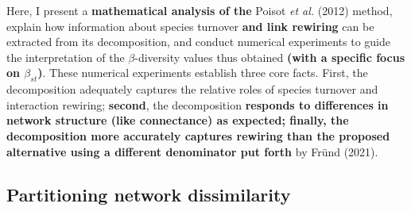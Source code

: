\documentclass[11pt]{article}
\makeatletter
\def\maxwidth{\ifdim\Gin@nat@width>\linewidth\linewidth
\else\Gin@nat@width\fi}
\let\Oldincludegraphics\includegraphics
\renewcommand{\includegraphics}[1]{\Oldincludegraphics[width=\maxwidth]{#1}}
\providecommand{\DIFaddtex}[1]{{\bf #1}} %
\providecommand{\DIFdeltex}[1]{} %
\providecommand{\DIFaddbegin}{\protect\color{blue}} %
\providecommand{\DIFaddend}{\protect\color{black}} %
\providecommand{\DIFdelbegin}{\protect\color{red}} %
\providecommand{\DIFdelend}{\protect\color{black}} %
\providecommand{\DIFadd}[1]{\texorpdfstring{\DIFaddtex{#1}}{#1}} %
\providecommand{\DIFdel}[1]{\texorpdfstring{\DIFdeltex{#1}}{}} %
\newcommand{\DIFscaledelfig}{0.5}
\newlength{\DIFdelgraphicswidth} %
\newlength{\DIFdelgraphicsheight} %
\newcommand{\DIFaddincludegraphics}[2][]{{\color{blue}\fbox{\DIFOincludegraphics[#1]{#2}}}} %
\newcommand{\DIFdelincludegraphics}[2][]{%
\sbox{\DIFdelgraphicsbox}{\DIFOincludegraphics[#1]{#2}}%
\settoboxwidth{\DIFdelgraphicswidth}{\DIFdelgraphicsbox} %
\settoboxtotalheight{\DIFdelgraphicsheight}{\DIFdelgraphicsbox} %
\scalebox{\DIFscaledelfig}{%
\parbox[b]{\DIFdelgraphicswidth}{\usebox{\DIFdelgraphicsbox}\\[-\baselineskip] \rule{\DIFdelgraphicswidth}{0em}}\llap{\resizebox{\DIFdelgraphicswidth}{\DIFdelgraphicsheight}{%
\setlength{\unitlength}{\DIFdelgraphicswidth}%
\begin{picture}(1,1)%
\thicklines\linethickness{2pt} %
{\color[rgb]{1,0,0}\put(0,0){\framebox(1,1){}}}%
{\color[rgb]{1,0,0}\put(0,0){\line( 1,1){1}}}%
{\color[rgb]{1,0,0}\put(0,1){\line(1,-1){1}}}%
\end{picture}%
}\hspace*{3pt}}} %
} %
\DeclareRobustCommand{\DIFaddbegin}{\DIFOaddbegin \let\includegraphics\DIFaddincludegraphics} %
\DeclareRobustCommand{\DIFaddend}{\DIFOaddend \let\includegraphics\DIFOincludegraphics} %
\DeclareRobustCommand{\DIFdelbegin}{\DIFOdelbegin \let\includegraphics\DIFdelincludegraphics} %
\DeclareRobustCommand{\DIFdelend}{\DIFOaddend \let\includegraphics\DIFOincludegraphics} %
\makeatother
\begin{document}
\DIFaddend Here, I present a \DIFdelbegin \DIFdel{more thorough justification of the methodological choices
for the }\DIFdelend \DIFaddbegin \DIFadd{mathematical analysis of the }\DIFaddend Poisot \emph{et al.}
(2012) method, explain how information about species turnover \DIFaddbegin \DIFadd{and link
rewiring }\DIFaddend can be extracted from its decomposition, and conduct numerical
experiments to guide the interpretation of the \(\beta\)-diversity
values thus obtained \DIFaddbegin \DIFadd{(with a specific focus on \(\beta_{st}\))}\DIFaddend . These
numerical experiments establish three core facts. First, the
decomposition \DIFdelbegin \DIFdel{responds to the
correct sources of network variation; second, the decomposition
}\DIFdelend adequately captures the relative roles of species turnover
and interaction rewiring; \DIFdelbegin \DIFdel{finally}\DIFdelend \DIFaddbegin \DIFadd{second}\DIFaddend , the decomposition \DIFdelbegin \DIFdel{adequately captures the
role of turnover vs.~non-turnover (like changes in connectance) processes. Although the
alternative normalization suggested }\DIFdelend \DIFaddbegin \DIFadd{responds to
differences in network structure (like connectance) as expected;
finally, the decomposition more accurately captures rewiring than the
proposed alternative using a different denominator put forth }\DIFaddend by Fründ
(2021)\DIFdelbegin \DIFdel{is not without its uses, which I discuss in conclusion, it is
inadequate as a network \(\beta\)-diversity measurement, as it
introduces many confounding elements that make the interpretation of the
results more difficult, and should likely not be used as a default}\DIFdelend .

\hypertarget{partitioning-network-dissimilarity}{%
\subsection{Partitioning network
dissimilarity}\label{partitioning-network-dissimilarity}}
\end{document}
